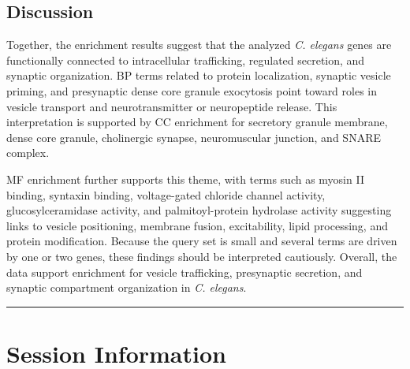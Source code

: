 \documentclass[
  11pt,
]{article}
\begin{document}
\subsection{Discussion}\label{discussion-1}

Together, the enrichment results suggest that the analyzed \emph{C.
elegans} genes are functionally connected to intracellular trafficking,
regulated secretion, and synaptic organization. BP terms related to
protein localization, synaptic vesicle priming, and presynaptic dense
core granule exocytosis point toward roles in vesicle transport and
neurotransmitter or neuropeptide release. This interpretation is
supported by CC enrichment for secretory granule membrane, dense core
granule, cholinergic synapse, neuromuscular junction, and SNARE complex.

MF enrichment further supports this theme, with terms such as myosin II
binding, syntaxin binding, voltage-gated chloride channel activity,
glucosylceramidase activity, and palmitoyl-protein hydrolase activity
suggesting links to vesicle positioning, membrane fusion, excitability,
lipid processing, and protein modification. Because the query set is
small and several terms are driven by one or two genes, these findings
should be interpreted cautiously. Overall, the data support enrichment
for vesicle trafficking, presynaptic secretion, and synaptic compartment
organization in \emph{C. elegans}.

\begin{center}\rule{0.5\linewidth}{0.5pt}\end{center}

\section{Session Information}\label{session-information}
\end{document}
